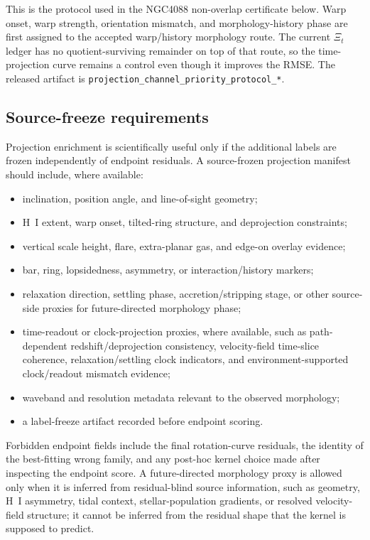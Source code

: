 \documentclass[11pt]{article}
\begin{document}
This is the protocol used in the NGC4088 non-overlap certificate below.  Warp
onset, warp strength, orientation mismatch, and morphology-history phase are
first assigned to the accepted warp/history morphology route.  The current
\(\Xi_t\) ledger has no quotient-surviving remainder on top of that route, so
the time-projection curve remains a control even though it improves the RMSE.
The released artifact is
\texttt{projection\_channel\_priority\_protocol\_*}.

\subsection{Source-freeze requirements}

Projection enrichment is scientifically useful only if the additional labels
are frozen independently of endpoint residuals.  A source-frozen projection
manifest should include, where available:
\begin{itemize}[leftmargin=*]
  \item inclination, position angle, and line-of-sight geometry;
  \item H~I extent, warp onset, tilted-ring structure, and deprojection
  constraints;
  \item vertical scale height, flare, extra-planar gas, and edge-on overlay
  evidence;
  \item bar, ring, lopsidedness, asymmetry, or interaction/history markers;
  \item relaxation direction, settling phase, accretion/stripping stage, or
  other source-side proxies for future-directed morphology phase;
  \item time-readout or clock-projection proxies, where available, such as
  path-dependent redshift/deprojection consistency, velocity-field time-slice
  coherence, relaxation/settling clock indicators, and environment-supported
  clock/readout mismatch evidence;
  \item waveband and resolution metadata relevant to the observed morphology;
  \item a label-freeze artifact recorded before endpoint scoring.
\end{itemize}
Forbidden endpoint fields include the final rotation-curve residuals, the
identity of the best-fitting wrong family, and any post-hoc kernel choice made
after inspecting the endpoint score.  A future-directed morphology proxy is
allowed only when it is inferred from residual-blind source information, such
as geometry, H~I asymmetry, tidal context, stellar-population gradients, or
resolved velocity-field structure; it cannot be inferred from the residual
shape that the kernel is supposed to predict.
\end{document}
